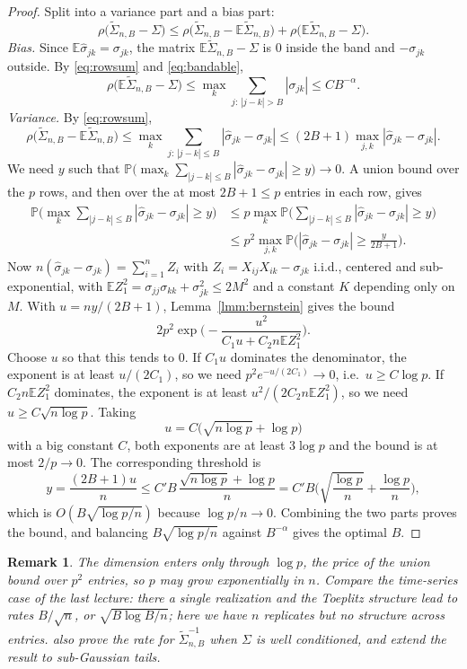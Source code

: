\documentclass[11pt]{article}
\newtheorem{remark}{Remark}
\newcommand{\wh}{\widehat}
\newcommand{\wt}{\widetilde}
\newcommand{\Prob}{\mathbb{P}}
\newcommand{\Expect}{\mathbb{E}}
\begin{document}
\begin{proof}
Split into a variance part and a bias part:
\[
\rho\big(\wt\Sigma_{n,B}-\Sigma\big)\le\rho\big(\wt\Sigma_{n,B}-\Expect\wt\Sigma_{n,B}\big)+\rho\big(\Expect\wt\Sigma_{n,B}-\Sigma\big).
\]
\emph{Bias.} Since $\Expect\wh\sigma_{jk}=\sigma_{jk}$, the matrix $\Expect\wt\Sigma_{n,B}-\Sigma$ is $0$ inside the band and $-\sigma_{jk}$ outside. By \eqref{eq:rowsum} and \eqref{eq:bandable},
\[
\rho\big(\Expect\wt\Sigma_{n,B}-\Sigma\big)\le\max_k\sum_{j:\,|j-k|>B}|\sigma_{jk}|\le CB^{-\alpha}.
\]
\emph{Variance.} By \eqref{eq:rowsum},
\[
\rho\big(\wt\Sigma_{n,B}-\Expect\wt\Sigma_{n,B}\big)\le\max_k\sum_{j:\,|j-k|\le B}|\wh\sigma_{jk}-\sigma_{jk}|\le(2B+1)\max_{j,k}|\wh\sigma_{jk}-\sigma_{jk}| .
\]
We need $y$ such that $\Prob\big(\max_k\sum_{|j-k|\le B}|\wh\sigma_{jk}-\sigma_{jk}|\ge y\big)\to0$. A union bound over the $p$ rows, and then over the at most $2B+1\le p$ entries in each row, gives
\begin{align*}
\Prob\Big(\max_k\sum_{|j-k|\le B}|\wh\sigma_{jk}-\sigma_{jk}|\ge y\Big)
&\le p\max_k\Prob\Big(\sum_{|j-k|\le B}|\wh\sigma_{jk}-\sigma_{jk}|\ge y\Big)\\
&\le p^2\max_{j,k}\Prob\Big(|\wh\sigma_{jk}-\sigma_{jk}|\ge\frac y{2B+1}\Big).
\end{align*}
Now $n(\wh\sigma_{jk}-\sigma_{jk})=\sum_{i=1}^nZ_i$ with $Z_i=X_{ij}X_{ik}-\sigma_{jk}$ i.i.d., centered and sub-exponential, with $\Expect Z_1^2=\sigma_{jj}\sigma_{kk}+\sigma_{jk}^2\le2M^2$ and a constant $K$ depending only on $M$. With $u=ny/(2B+1)$, Lemma~\ref{lmm:bernstein} gives the bound
\[
2p^2\exp\Big(-\frac{u^2}{C_1u+C_2n\Expect Z_1^2}\Big).
\]
Choose $u$ so that this tends to $0$. If $C_1u$ dominates the denominator, the exponent is at least $u/(2C_1)$, so we need $p^2e^{-u/(2C_1)}\to0$, i.e.\ $u\ge C\log p$. If $C_2n\Expect Z_1^2$ dominates, the exponent is at least $u^2/(2C_2n\Expect Z_1^2)$, so we need $u\ge C\sqrt{n\log p}$. Taking
\[
u=C\big(\sqrt{n\log p}+\log p\big)
\]
with a big constant $C$, both exponents are at least $3\log p$ and the bound is at most $2/p\to0$. The corresponding threshold is
\[
y=\frac{(2B+1)u}n\le C'B\,\frac{\sqrt{n\log p}+\log p}n=C'B\Big(\sqrt{\frac{\log p}n}+\frac{\log p}n\Big),
\]
which is $O(B\sqrt{\log p/n})$ because $\log p/n\to0$. Combining the two parts proves the bound, and balancing $B\sqrt{\log p/n}$ against $B^{-\alpha}$ gives the optimal $B$.
\end{proof}

\begin{remark}
The dimension enters only through $\log p$, the price of the union bound over $p^2$ entries, so $p$ may grow exponentially in $n$. Compare the time-series case of the last lecture: there a single realization and the Toeplitz structure lead to rates $B/\sqrt n$, or $\sqrt{B\log B/n}$; here we have $n$ replicates but no structure across entries. \citet{BL08a} also prove the rate for $\wt\Sigma_{n,B}^{-1}$ when $\Sigma$ is well conditioned, and extend the result to sub-Gaussian tails.
\end{remark}
\end{document}
